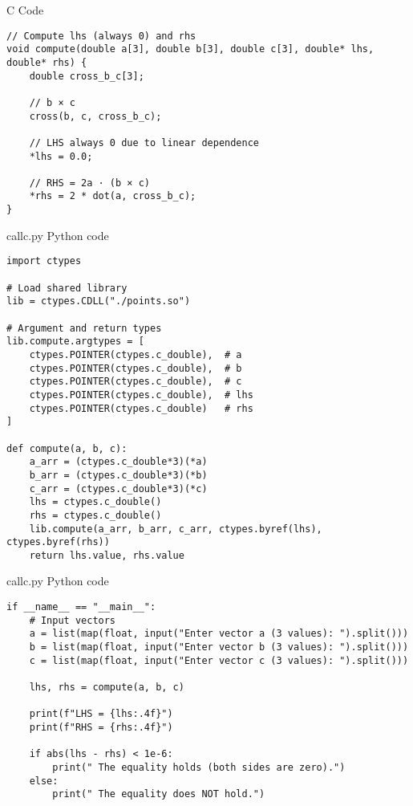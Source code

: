 \documentclass{beamer}
\numberwithin{equation}{section}
\begin{document}
\begin{frame}[fragile]{C Code}
\begin{lstlisting}
// Compute lhs (always 0) and rhs
void compute(double a[3], double b[3], double c[3], double* lhs, double* rhs) {
    double cross_b_c[3];

    // b × c
    cross(b, c, cross_b_c);

    // LHS always 0 due to linear dependence
    *lhs = 0.0;

    // RHS = 2a · (b × c)
    *rhs = 2 * dot(a, cross_b_c);
}
\end{lstlisting}
\end{frame}
\begin{frame}[fragile]{callc.py Python code}
\begin{lstlisting}
import ctypes

# Load shared library
lib = ctypes.CDLL("./points.so")

# Argument and return types
lib.compute.argtypes = [
    ctypes.POINTER(ctypes.c_double),  # a
    ctypes.POINTER(ctypes.c_double),  # b
    ctypes.POINTER(ctypes.c_double),  # c
    ctypes.POINTER(ctypes.c_double),  # lhs
    ctypes.POINTER(ctypes.c_double)   # rhs
]

def compute(a, b, c):
    a_arr = (ctypes.c_double*3)(*a)
    b_arr = (ctypes.c_double*3)(*b)
    c_arr = (ctypes.c_double*3)(*c)
    lhs = ctypes.c_double()
    rhs = ctypes.c_double()
    lib.compute(a_arr, b_arr, c_arr, ctypes.byref(lhs), ctypes.byref(rhs))
    return lhs.value, rhs.value
\end{lstlisting}
\end{frame}
\begin{frame}[fragile]{callc.py Python code}
\begin{lstlisting}
if __name__ == "__main__":
    # Input vectors
    a = list(map(float, input("Enter vector a (3 values): ").split()))
    b = list(map(float, input("Enter vector b (3 values): ").split()))
    c = list(map(float, input("Enter vector c (3 values): ").split()))

    lhs, rhs = compute(a, b, c)

    print(f"LHS = {lhs:.4f}")
    print(f"RHS = {rhs:.4f}")

    if abs(lhs - rhs) < 1e-6:
        print(" The equality holds (both sides are zero).")
    else:
        print(" The equality does NOT hold.")

\end{lstlisting}
\end{frame}
\end{document}
